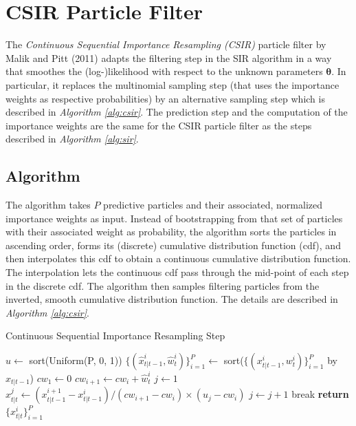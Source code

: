 \documentclass[11pt, oneside]{scrreprt}   	%
\begin{document}
\section{CSIR Particle Filter}
The \textit{Continuous Sequential Importance Resampling (CSIR)} particle filter by Malik and Pitt (2011) adapts the filtering step in the SIR algorithm in a way that smoothes the (log-)likelihood with respect to the unknown parameters $\boldsymbol{\theta}$. In particular, it replaces the multinomial sampling step (that uses the importance weights as respective probabilities) by an alternative sampling step which is described in \textit{Algorithm \ref{alg:csir}}. The prediction step and the computation of the importance weights are the same for the CSIR particle filter as the steps described in \textit{Algorithm \ref{alg:sir}}. 

\subsection{Algorithm}
The algorithm takes $P$ predictive particles and their associated, normalized importance weights as input. Instead of bootstrapping from that set of particles with their associated weight as probability, the algorithm sorts the particles in ascending order, forms its (discrete) cumulative distribution function (cdf), and then interpolates this cdf to obtain a continuous cumulative distribution function. The interpolation lets the continuous cdf pass through the mid-point of each step in the discrete cdf. The algorithm then samples filtering particles from the inverted, smooth cumulative distribution function. The details are described in \textit{Algorithm \ref{alg:csir}}.\\

\begin{algorithm}[h!]
\caption{Continuous Sequential Importance Resampling Step}
\label{alg:csir}
\begin{algorithmic}[1]
      	\smallskip
	\State $u \gets$ sort(Uniform(P, 0, 1))
	\smallskip
	\State $\{(\hat{x}_{t | t - 1}^i, \hat{w}_t^i)\}_{i=1}^P \gets$ sort($\{(x_{t | t - 1}^i, w_t^i)\}_{i=1}^P$ by $x_{t | t - 1}$)
	\smallskip
	\State $cw_1 \gets 0$
		\State $cw_{i+1} \gets cw_{i} +  \hat{w}_t^i$ 
	\EndFor	
      	\smallskip
	\State $j \gets 1$
	 
			\State $x_{t | t}^j \gets (x_{t | t - 1}^{i+1} - x_{t | t-1}^i) / (cw_{i+1} - cw_i) \times (u_j - cw_i)$
			\smallskip
				\State $j \gets j + 1$ 
			\Else 
				\State break 
			\EndIf
		\EndWhile 
	\EndFor		
	\smallskip
      \State \textbf{return} $\{x_{t | t}^i\}_{i=1}^P$
    \EndProcedure
  \end{algorithmic}
\end{algorithm}
\end{document}
